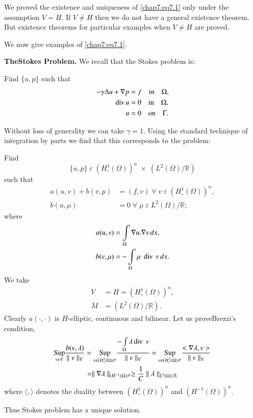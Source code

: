\begin{REM}\label{chap7:rem3}
We proved the existence and uniqueness of \eqref{chap7:eq7.1} only
under the assumption $V=H$. If $V\neq H$ then we do not have a
general existence theorem. But existence theorems for particular
examples when $V\neq H$ are proved.

We now give examples of \eqref{chap7:eq7.1}. 
\end{REM}

\setcounter{exam}{0}
\begin{exam}\label{chap7:exm1}
{\bf The\pageoriginale Stokes Problem.} We recall that the Stokes
problem is: 

Find $\{u,p\}$ such that 
\begin{align*}
-\gamma\Delta u+\nabla p &= f\quad\text{in}\quad\Omega,\\
\operatorname{div} u &= 0\quad\text{in}\quad\Omega,\\
u &= 0\quad\text{on}\quad\Gamma.
\end{align*}

Without loss of generality we can take $\gamma =1$. Using the standard
technique of integration by parts we find that this corresponds to the
problem:

Find
$$
\{u,p\}\;\varepsilon\;(H_\circ^1(\Omega))^n\;\times\;(L^2(\Omega)/
\mathbb{R})
$$
such that 
\begin{align*}
a(u,v)+b(v,p) &= (f,v)\;\forall\;v\;\varepsilon\;(H_\circ^1
(\Omega))^n,\\ 
b(u,\mu) &= 0\;\forall\;\mu\;\varepsilon\;L^2(\Omega)/\mathbb{R};
\end{align*}
where
\begin{align*}
a(u,v) &= \int\limits_\Omega\nabla u.\nabla v\,dx,\\
b(v,\mu) &= -\int\limits_\Omega\mu\;\operatorname{div}\;v\,dx.
\end{align*}
We take
\begin{align*}
V &= H=(H_\circ^1(\Omega))^n,\\
M &= (L^2(\Omega)/\mathbb{R}).
\end{align*}
Clearly $a(\cdotp,\cdotp)$ is $H$-elliptic, continuous and
bilinear. Let us prove\break Brezzi's condition, 
\begin{gather*}
\underset{v\varepsilon V}{\operatorname{Sup}}\frac{b(v,\lambda)}{\parallel
v\parallel_V}=\underset{v\varepsilon(H_\circ^1(\Omega))^n}{\operatorname{Sup}}
\frac{-\int\limits_\Omega\lambda\operatorname{div}\;v}{\parallel v\parallel_V}=
\underset{v\varepsilon(H_\circ^1(\Omega))^n}{\operatorname{Sup}}
\frac{<\nabla\lambda,v>}{\parallel v\parallel_V}\\
=\parallel\nabla\lambda\parallel_{(H^{-1}(\Omega))^n}\geq\frac{1}{C}
\parallel\lambda\parallel_{L^2(\Omega)/\mathbb{R}}
\end{gather*}\pageoriginale
where $\langle , \rangle$ denotes the duality between $(H_\circ^1(\Omega))^n$ and
$(H^{-1}(\Omega))^n$. 

Thus Stokes problem has a unique solution. 
\end{exam}

